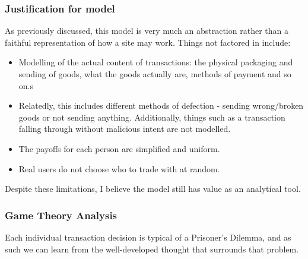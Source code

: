\documentclass{article}
\begin{document}
\subsubsection{Justification for model}
\label{sec:justification-model}
As previously discussed, this model is very much an abstraction rather than a faithful representation of how a site may work. Things not factored in include:
\begin{itemize}
	\item Modelling of the actual content of transactions: the physical packaging and sending of goods, what the goods actually are, methods of payment and so on.s
	\item Relatedly, this includes different methods of defection - sending wrong/broken goods or not sending anything. Additionally, things such as a transaction falling through without malicious intent are not modelled.
	\item The payoffs for each person are simplified and uniform.
	\item Real users do not choose who to trade with at random.
\end{itemize}

Despite these limitations, I believe the model still has value as an analytical tool.

\subsubsection{Game Theory Analysis}
\label{sec:game-theory}
Each individual transaction decision is typical of a Prisoner's Dilemma, and as such we can learn from the well-developed thought that surrounds that problem.
\end{document}
